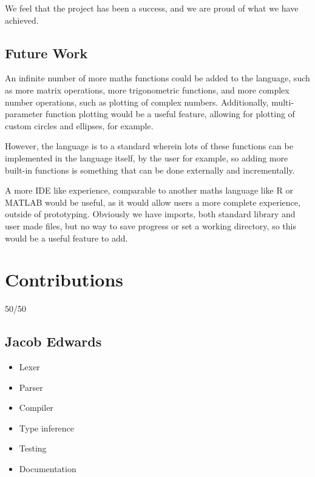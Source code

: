 \documentclass[a4paper, oneside, 11pt]{report}
\begin{document}
We feel that the project has been a success, and we are proud of what we have achieved.

\section{Future Work}\label{sec:future-work}

An infinite number of more maths functions could be added to the language, such as more matrix operations, more
trigonometric functions, and more complex number operations, such as plotting of complex numbers.
Additionally, multi-parameter function plotting would be a useful feature, allowing for plotting of custom circles and
ellipses, for example.

However, the language is to a standard wherein lots of these functions can be implemented in the language itself, by 
the user for example, so adding more built-in functions is something that can be done externally and incrementally.

A more IDE like experience, comparable to another maths language like R or MATLAB would be useful, as it would allow 
users a more complete experience, outside of prototyping.
Obviously we have imports, both standard library and user made files, but no way to save progress or set a working 
directory, so this would be a useful feature to add.






\appendix
\chapter{Contributions}\label{ch:contributions}

50/50

\section{Jacob Edwards}\label{sec:jacob-edwards}

\begin{itemize}
    \item Lexer
    \item Parser
    \item Compiler
    \item Type inference
    \item Testing
    \item Documentation
\end{itemize}
\end{document}
